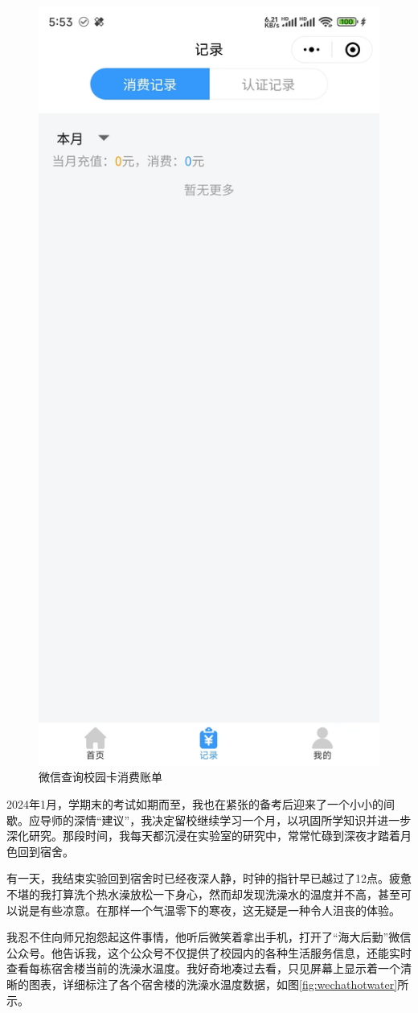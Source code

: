 \begin{figure}
	\centering
	\includegraphics[width=0.6\linewidth]{Resources/Picture/wechat_bill}
	\caption{微信查询校园卡消费账单}
	\label{fig:wechatbill}
\end{figure}

2024年1月，学期末的考试如期而至，我也在紧张的备考后迎来了一个小小的间歇。应导师的深情“建议”，我决定留校继续学习一个月，以巩固所学知识并进一步深化研究。那段时间，我每天都沉浸在实验室的研究中，常常忙碌到深夜才踏着月色回到宿舍。

有一天，我结束实验回到宿舍时已经夜深人静，时钟的指针早已越过了12点。疲惫不堪的我打算洗个热水澡放松一下身心，然而却发现洗澡水的温度并不高，甚至可以说是有些凉意。在那样一个气温零下的寒夜，这无疑是一种令人沮丧的体验。

我忍不住向师兄抱怨起这件事情，他听后微笑着拿出手机，打开了“海大后勤”微信公众号。他告诉我，这个公众号不仅提供了校园内的各种生活服务信息，还能实时查看每栋宿舍楼当前的洗澡水温度。我好奇地凑过去看，只见屏幕上显示着一个清晰的图表，详细标注了各个宿舍楼的洗澡水温度数据，如图\ref{fig:wechathotwater}所示。

